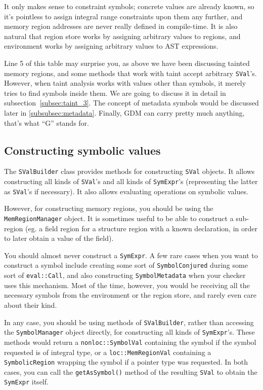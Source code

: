 \documentclass[a4paper,12pt]{article}
\begin{document}
It only makes sense to constraint symbols; concrete values are already known, so it's pointless to assign integral range constraints upon them any further, and memory region addresses are never really defined in compile-time. It is also natural that region store works by assigning arbitrary values to regions, and environment works by assigning arbitrary values to AST expressions.

Line 5 of this table may surprise you, as above we have been discussing tainted memory regions, and some methods that work with taint accept arbitrary \lstinline|SVal|'s. However, when taint analysis works with values other than symbols, it merely tries to find symbols inside them. We are going to discuss it in detail in subsection~\ref{subsec:taint_3}. The concept of metadata symbols would be discussed later in \ref{subsubsec:metadata}. Finally, GDM can carry pretty much anything, that's what ``G'' stands for.

\subsection{Constructing symbolic values}

The \lstinline|SValBuilder| class provides methods for constructing \lstinline|SVal| objects. It allows constructing all kinds of \lstinline|SVal|'s and all kinds of \lstinline|SymExpr|'s (representing the latter as \lstinline|SVal|'s if necessary). It also allows evaluating operations on symbolic values.

However, for constructing memory regions, you should be using the \lstinline|MemRegionManager| object. It is sometimes useful to be able to construct a sub-region (eg. a field region for a structure region with a known declaration, in order to later obtain a value of the field).

You should almost never construct a \lstinline|SymExpr|. A few rare cases when you want to construct a symbol include creating some sort of \lstinline|SymbolConjured| during some sort of \lstinline|eval::Call|, and also constructing \lstinline|SymbolMetadata| when your checker uses this mechanism. Most of the time, however, you would be receiving all the necessary symbols from the environment or the region store, and rarely even care about their kind.

In any case, you should be using methods of \lstinline|SValBuilder|, rather than accessing the \lstinline|SymbolManager| object directly, for constructing all kinds of \lstinline|SymExpr|'s. These methods would return a \lstinline|nonloc::SymbolVal| containing the symbol if the symbol requested is of integral type, or a \lstinline|loc::MemRegionVal| containing a \lstinline|SymbolicRegion| wrapping the symbol if a pointer type was requested. In both cases, you can call the \lstinline|getAsSymbol()| method of the resulting \lstinline|SVal| to obtain the \lstinline|SymExpr| itself.
\end{document}
